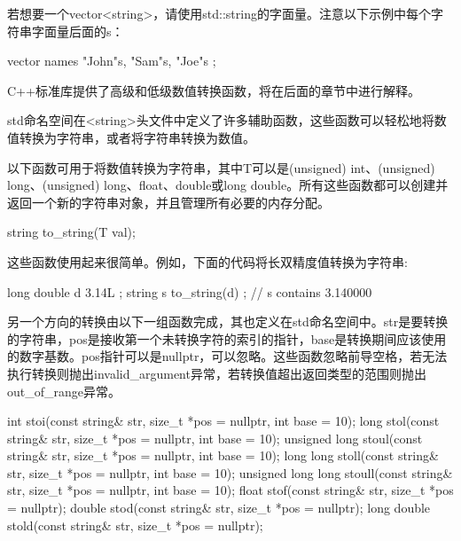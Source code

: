 若想要一个vector<string>，请使用std::string的字面量。注意以下示例中每个字符串字面量后面的s：

\begin{cpp}
vector names { "John"s, "Sam"s, "Joe"s };
\end{cpp}


C++标准库提供了高级和低级数值转换函数，将在后面的章节中进行解释。


std命名空间在<string>头文件中定义了许多辅助函数，这些函数可以轻松地将数值转换为字符串，或者将字符串转换为数值。


以下函数可用于将数值转换为字符串，其中T可以是(unsigned) int、(unsigned) long、(unsigned) long、float、double或long double。所有这些函数都可以创建并返回一个新的字符串对象，并且管理所有必要的内存分配。

\begin{cpp}
string to_string(T val);
\end{cpp}

这些函数使用起来很简单。例如，下面的代码将长双精度值转换为字符串:

\begin{cpp}
long double d { 3.14L };
string s { to_string(d) }; // s contains 3.140000
\end{cpp}


另一个方向的转换由以下一组函数完成，其也定义在std命名空间中。str是要转换的字符串，pos是接收第一个未转换字符的索引的指针，base是转换期间应该使用的数字基数。pos指针可以是nullptr，可以忽略。这些函数忽略前导空格，若无法执行转换则抛出invalid\_argument异常，若转换值超出返回类型的范围则抛出out\_of\_range异常。

\begin{cpp}
int stoi(const string& str, size_t *pos = nullptr, int base = 10);
long stol(const string& str, size_t *pos = nullptr, int base = 10);
unsigned long stoul(const string& str, size_t *pos = nullptr, int base = 10);
long long stoll(const string& str, size_t *pos = nullptr, int base = 10);
unsigned long long stoull(const string& str, size_t *pos = nullptr, int base = 10);
float stof(const string& str, size_t *pos = nullptr);
double stod(const string& str, size_t *pos = nullptr);
long double stold(const string& str, size_t *pos = nullptr);
\end{cpp}

